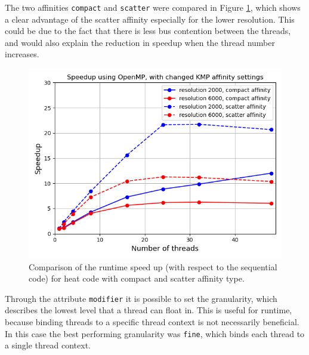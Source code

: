 The two affinities \verb|compact| and \verb|scatter| were compared in Figure \ref{fig:kmp-affinity}, which shows a clear advantage of the scatter affinity especially for the lower resolution. This could be due to the fact that there is less bus contention between the threads, and would also explain the reduction in speedup when the thread number increases. 


\begin{figure}[h]
    \centering
    \includegraphics[width=0.7\linewidth]{figures/kmp_affinity.png}
    \caption{Comparison of the runtime speed up (with respect to the sequential code) for heat code with compact and scatter affinity type.}
    \label{fig:kmp-affinity}
\end{figure}

Through the attribute \verb|modifier| it is possible to set the granularity, which describes the lowest level that a thread can float in. This is useful for runtime, because binding threads to a specific thread context is not necessarily beneficial. In this case the best performing granularity was \verb|fine|, which binds each thread to a single thread context.

